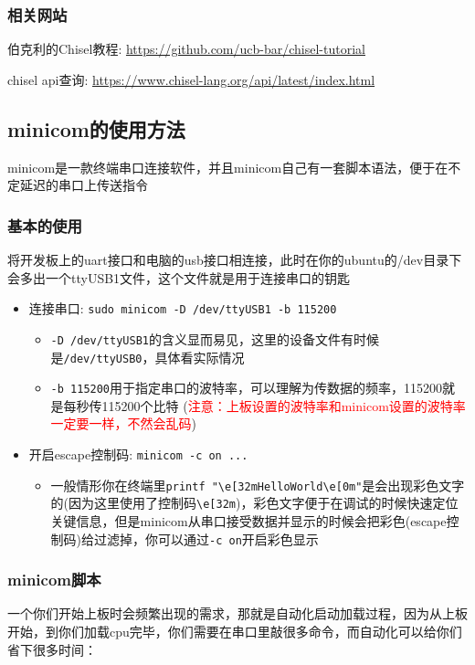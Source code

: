 \documentclass[lang=cn,11pt,a4paper]{elegantpaper}
\begin{document}
\subsubsection{相关网站}
伯克利的Chisel教程: \url{https://github.com/ucb-bar/chisel-tutorial}

chisel api查询: \url{https://www.chisel-lang.org/api/latest/index.html}

\subsection{minicom的使用方法}\label{minicom}

minicom是一款终端串口连接软件，并且minicom自己有一套脚本语法，便于在不定延迟的串口上传送指令

\subsubsection{基本的使用}
将开发板上的uart接口和电脑的usb接口相连接，此时在你的ubuntu的/dev目录下会多出一个ttyUSB1文件，这个文件就是用于连接串口的钥匙
\begin{itemize}
\item 连接串口: \lstinline!sudo minicom -D /dev/ttyUSB1 -b 115200!
\begin{itemize}
\item \lstinline!-D /dev/ttyUSB1!的含义显而易见，这里的设备文件有时候是\lstinline!/dev/ttyUSB0!，具体看实际情况
\item \lstinline!-b 115200!用于指定串口的波特率，可以理解为传数据的频率，115200就是每秒传115200个比特 (\textcolor{red}{注意：上板设置的波特率和minicom设置的波特率一定要一样，不然会乱码})
\end{itemize}
\item 开启escape控制码: \lstinline!minicom -c on ...!
\begin{itemize}
\item 一般情形你在终端里\lstinline!printf "\e[32mHelloWorld\e[0m"!是会出现彩色文字的(因为这里使用了控制码\lstinline!\e[32m!)，彩色文字便于在调试的时候快速定位关键信息，但是minicom从串口接受数据并显示的时候会把彩色(escape控制码)给过滤掉，你可以通过\lstinline!-c on!开启彩色显示
\end{itemize}
\end{itemize}

\subsubsection{minicom脚本}
一个你们开始上板时会频繁出现的需求，那就是自动化启动加载过程，因为从上板开始，到你们加载cpu完毕，你们需要在串口里敲很多命令，而自动化可以给你们省下很多时间：
\end{document}
